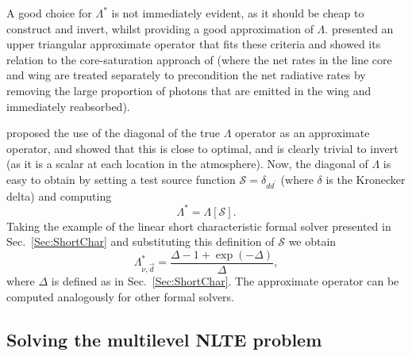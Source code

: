 A good choice for $\Lambda^*$ is not immediately evident, as it should be cheap to construct and invert, whilst providing a good approximation of $\Lambda$.
\citet{Scharmer1981} presented an upper triangular approximate operator that fits these criteria and showed its relation to the core-saturation approach of \citet{Rybicki1972} (where the net rates in the line core and wing are treated separately to precondition the net radiative rates by removing the large proportion of photons that are emitted in the wing and immediately reabsorbed).

\citet{Olson1986} proposed the use of the diagonal of the true $\Lambda$ operator as an approximate operator, and showed that this is close to optimal, and is clearly trivial to invert (as it is a scalar at each location in the atmosphere).
Now, the diagonal of $\Lambda$ is easy to obtain by setting a test source function $\mathcal{S}=\delta_{dd^\prime}$ (where $\delta$ is the Kronecker delta) and computing
\begin{equation}
    \Lambda^* = \Lambda[\mathcal{S}].
\end{equation}
Taking the example of the linear short characteristic formal solver presented in Sec.~\ref{Sec:ShortChar} and substituting this definition of $\mathcal{S}$ we obtain
\begin{equation}
    \Lambda^*_{\nu, \vec{d}} = \frac{\Delta - 1 + \exp(-\Delta)}{\Delta},
\end{equation}
where $\Delta$ is defined as in Sec.~\ref{Sec:ShortChar}.
The approximate operator can be computed analogously for other formal solvers.

\subsection{Solving the multilevel NLTE problem}\label{Sec:MALI}


